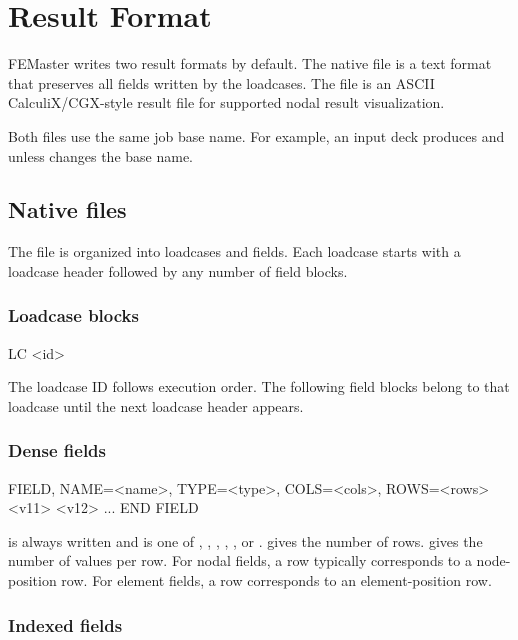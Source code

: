 \chapter{Result Format}

FEMaster writes two result formats by default. The native  file is a text format that preserves all fields written by the loadcases. The  file is an ASCII CalculiX/CGX-style result file for supported nodal result visualization.

Both files use the same job base name. For example, an input deck  produces  and  unless  changes the base name.

\section{Native  files}

The  file is organized into loadcases and fields. Each loadcase starts with a loadcase header followed by any number of field blocks.

\subsection{Loadcase blocks}

\begin{syntax}
LC <id>
\end{syntax}

The loadcase ID follows execution order. The following field blocks belong to that loadcase until the next loadcase header appears.

\subsection{Dense fields}

\begin{syntax}
FIELD, NAME=<name>, TYPE=<type>, COLS=<cols>, ROWS=<rows>
<v11> <v12> ...
END FIELD
\end{syntax}

 is always written and is one of , , , , , or .  gives the number of rows.  gives the number of values per row. For nodal fields, a row typically corresponds to a node-position row. For element fields, a row corresponds to an element-position row.

\subsection{Indexed fields}

